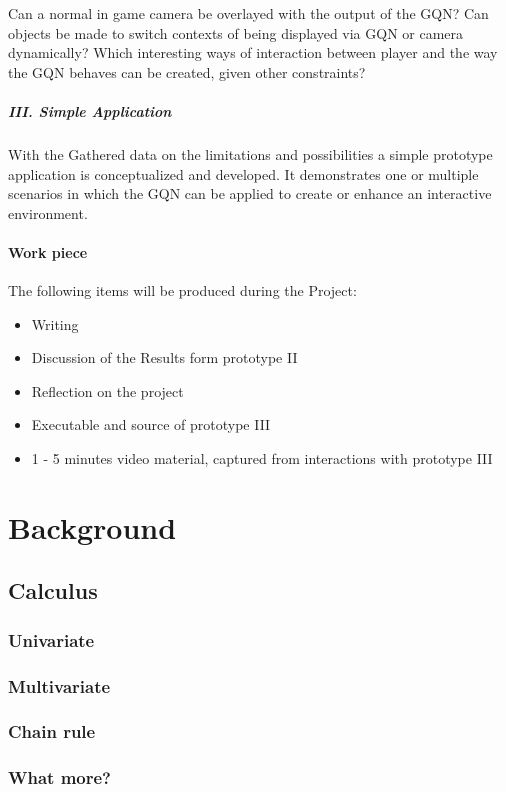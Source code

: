 \documentclass[a4paper, twoside, 10pt]{report}
\begin{document}
Can a normal in game camera be overlayed with the output of the GQN?
Can objects be made to switch contexts of being displayed via GQN or camera dynamically?
Which interesting ways of interaction between player and the way the GQN behaves can be created, given other constraints?

\paragraph{III. Simple Application}
With the Gathered data on the limitations and possibilities a simple prototype application is conceptualized and developed. It demonstrates one or multiple scenarios in which the GQN can be applied to create or enhance an interactive environment.

\subsubsection{Work piece}
The following items will be produced during the Project:
\begin{itemize}
\item{Writing}
\item{Discussion of the Results form prototype II}
\item{Reflection on the project}
\item{Executable and source of prototype III}
\item{1 - 5 minutes video material, captured from interactions with prototype III}
\end{itemize}

\chapter{Background}

\section{Calculus}
\subsection{Univariate}
\subsection{Multivariate}
\subsection{Chain rule}
\subsection{What more?}
\end{document}
